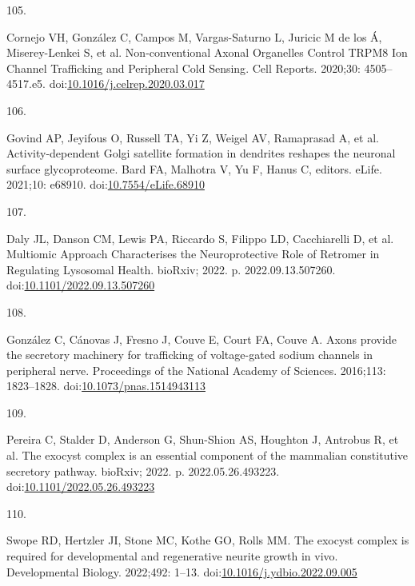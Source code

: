 \documentclass[
  12pt,
  a4paper,
]{book}
\newlength{\cslhangindent}
\newlength{\csllabelwidth}
\newlength{\cslentryspacingunit} %
\newenvironment{CSLReferences}[2] %
 {%
  \setlength{\parindent}{0pt}
  \ifodd #1
  \let\oldpar\par
  \def\par{\hangindent=\cslhangindent\oldpar}
  \fi
  \setlength{\parskip}{#2\cslentryspacingunit}
 }%
 {}
\newcommand{\CSLLeftMargin}[1]{\parbox[t]{\csllabelwidth}{#1}}
\newcommand{\CSLRightInline}[1]{\parbox[t]{\linewidth - \csllabelwidth}{#1}\break}
\begin{document}
\begin{CSLReferences}{0}{0}
\leavevmode{}%
\CSLLeftMargin{105. }%
\CSLRightInline{Cornejo VH, González C, Campos M, Vargas-Saturno L, Juricic M de los Á, Miserey-Lenkei S, et al. Non-conventional {Axonal Organelles Control TRPM8 Ion Channel Trafficking} and {Peripheral Cold Sensing}. Cell Reports. 2020;30: 4505--4517.e5. doi:\href{https://doi.org/10.1016/j.celrep.2020.03.017}{10.1016/j.celrep.2020.03.017}}

\leavevmode{}%
\CSLLeftMargin{106. }%
\CSLRightInline{Govind AP, Jeyifous O, Russell TA, Yi Z, Weigel AV, Ramaprasad A, et al. Activity-dependent {Golgi} satellite formation in dendrites reshapes the neuronal surface glycoproteome. Bard FA, Malhotra V, Yu F, Hanus C, editors. eLife. 2021;10: e68910. doi:\href{https://doi.org/10.7554/eLife.68910}{10.7554/eLife.68910}}

\leavevmode{}%
\CSLLeftMargin{107. }%
\CSLRightInline{Daly JL, Danson CM, Lewis PA, Riccardo S, Filippo LD, Cacchiarelli D, et al. Multiomic {Approach Characterises} the {Neuroprotective Role} of {Retromer} in {Regulating Lysosomal Health}. {bioRxiv}; 2022. p. 2022.09.13.507260. doi:\href{https://doi.org/10.1101/2022.09.13.507260}{10.1101/2022.09.13.507260}}

\leavevmode{}%
\CSLLeftMargin{108. }%
\CSLRightInline{González C, Cánovas J, Fresno J, Couve E, Court FA, Couve A. Axons provide the secretory machinery for trafficking of voltage-gated sodium channels in peripheral nerve. Proceedings of the National Academy of Sciences. 2016;113: 1823--1828. doi:\href{https://doi.org/10.1073/pnas.1514943113}{10.1073/pnas.1514943113}}

\leavevmode{}%
\CSLLeftMargin{109. }%
\CSLRightInline{Pereira C, Stalder D, Anderson G, Shun-Shion AS, Houghton J, Antrobus R, et al. The exocyst complex is an essential component of the mammalian constitutive secretory pathway. {bioRxiv}; 2022. p. 2022.05.26.493223. doi:\href{https://doi.org/10.1101/2022.05.26.493223}{10.1101/2022.05.26.493223}}

\leavevmode{}%
\CSLLeftMargin{110. }%
\CSLRightInline{Swope RD, Hertzler JI, Stone MC, Kothe GO, Rolls MM. The exocyst complex is required for developmental and regenerative neurite growth in vivo. Developmental Biology. 2022;492: 1--13. doi:\href{https://doi.org/10.1016/j.ydbio.2022.09.005}{10.1016/j.ydbio.2022.09.005}}


\end{CSLReferences}
\end{document}

